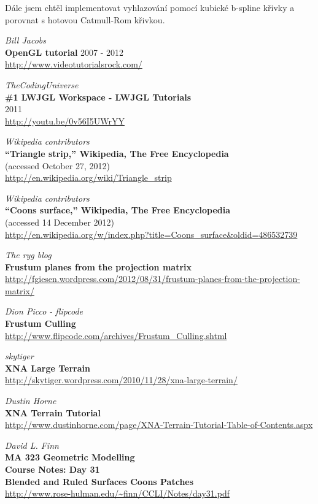 \documentclass{zcu_sp}
\begin{document}
Dále jsem chtěl implementovat vyhlazování pomocí kubické b-spline křivky a
porovnat s hotovou Catmull-Rom křivkou. 


\begin{thebibliography}{5}
{\em Bill Jacobs} \\
{\bf OpenGL tutorial}
	2007 - 2012 \\
\url{http://www.videotutorialsrock.com/}

{\em TheCodingUniverse} \\
{\bf \#1 LWJGL Workspace - LWJGL Tutorials} \\
	2011 \\
\url{http://youtu.be/0v56I5UWrYY}

{\em Wikipedia contributors} \\
{\bf ``Triangle strip,'' Wikipedia, The Free Encyclopedia} \\
	(accessed October 27, 2012) \\
\url{http://en.wikipedia.org/wiki/Triangle_strip}

{\em Wikipedia contributors} \\
{\bf ``Coons surface,'' Wikipedia, The Free Encyclopedia} \\
	(accessed 14 December 2012) \\
\url{http://en.wikipedia.org/w/index.php?title=Coons_surface&oldid=486532739}

{\em The ryg blog} \\
{\bf Frustum planes from the projection matrix} \\
\url{http://fgiesen.wordpress.com/2012/08/31/frustum-planes-from-the-projection-matrix/}

{\em Dion Picco - flipcode} \\
{\bf Frustum Culling} \\
\url{http://www.flipcode.com/archives/Frustum_Culling.shtml}

{\em skytiger} \\
{\bf XNA Large Terrain} \\
\url{http://skytiger.wordpress.com/2010/11/28/xna-large-terrain/}

{\em Dustin Horne} \\
{\bf XNA Terrain Tutorial} \\
\url{http://www.dustinhorne.com/page/XNA-Terrain-Tutorial-Table-of-Contents.aspx}

{\em David L. Finn} \\
{\bf MA 323 Geometric Modelling \\ Course Notes: Day 31 \\ Blended and Ruled Surfaces Coons Patches} \\
\url{http://www.rose-hulman.edu/~finn/CCLI/Notes/day31.pdf}

\end{thebibliography}
\end{document}
